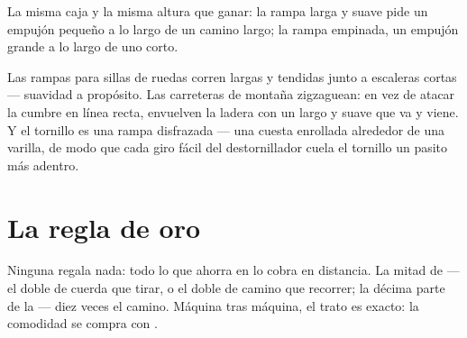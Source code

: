 \begin{omfigure}

{\small La misma caja y la misma altura que ganar: la rampa larga y
suave pide un empujón pequeño a lo largo de un camino largo; la rampa
empinada, un empujón grande a lo largo de uno corto.}
\end{omfigure}

\begin{example}\label{ex:g5:simple-machines:ramps}
Las rampas para sillas de ruedas corren largas y tendidas junto a
escaleras cortas --- suavidad a propósito. Las carreteras de montaña
zigzaguean: en vez de atacar la cumbre en línea recta, envuelven la
ladera con un  largo y suave que va y viene. Y el
tornillo es una rampa disfrazada --- una cuesta enrollada alrededor de
una varilla, de modo que cada giro fácil del destornillador cuela el
tornillo un pasito más adentro.
\end{example}

\section{La regla de oro}

\begin{proposition}\label{prop:g5:simple-machines:golden}
Ninguna  regala nada: todo lo que ahorra en
 lo cobra en distancia. La mitad de  --- el doble de
cuerda que tirar, o el doble de camino que recorrer; la décima parte
de la  --- diez veces el camino. Máquina tras máquina, el
trato es exacto: la comodidad se compra con .
\end{proposition}


